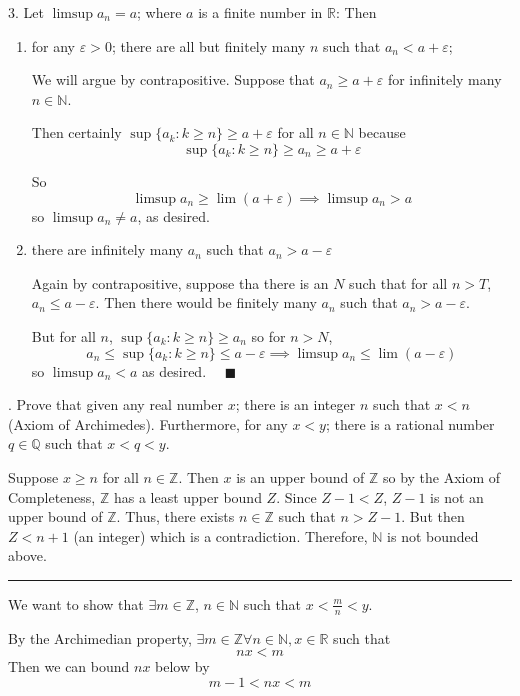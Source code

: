 \documentclass[12pt]{article}
\newcommand{\R}{\mathbb{R}}
\newcommand{\Z}{\mathbb{Z}}
\newcommand{\N}{\mathbb{N}}
\newcommand{\Q}{\mathbb{Q}}
\newcommand{\qed}{\quad \blacksquare}
\newcommand{\ep}{\varepsilon}
\renewcommand{\div}{\vspace*{10pt}\hrule\vspace*{10pt}}
\begin{document}
\pagebreak 

3. Let $\limsup a_n = a$; where $a$ is a finite number in $\R$: Then 
\begin{enumerate}
    \item for any $\ep > 0$; there are all but finitely many $n$ such that $a_n < a + \ep$;
    
    \color{blue}
        We will argue by contrapositive. Suppose that $a_n \geq a + \ep$ for infinitely many $n \in \N$.

        Then certainly $\sup\{a_k: k \geq n\} \geq a +\ep$ for all $n \in \N$ because  
        \[\sup\{a_k: k \geq n\} \geq a_n \geq a + \ep\]

        So 
        \[\limsup a_n \geq \lim (a + \ep) \implies \limsup a_n > a\] 
        so $\limsup a_n \neq a$, as desired. 
        
    \color{black}

    \item there are infinitely many $a_n$ such that $a_n > a - \ep$
    
    \color{blue}
        Again by contrapositive, suppose tha there is an $N$ such that for all $n > T$, $a_n \leq a - \ep$. Then there would be finitely many $a_n$ such that $a_n > a - \ep$.

        But for all $n$, $\sup \{a_k: k \geq n\} \geq a_n$ so for $n > N$, 
        \[a_n \leq \sup \{a_k: k \geq n\} \leq a - \ep \implies \limsup a_n \leq \lim (a- \ep)\]
        so $\limsup a_n < a$ as desired. $\qed$

    \color{black}
\end{enumerate}


. Prove that given any real number $x$; there is an integer $n$ such that $x < n$
(Axiom of Archimedes). Furthermore, for any $x < y$; there is a rational number
$q \in \Q$ such that $x < q < y$.

\color{blue}
    Suppose $x \geq n$ for all $n \in \Z$. Then $x$ is an upper bound of $\Z$ so by the Axiom of Completeness, $\Z$ has a least upper bound $Z$. Since $Z - 1 < Z$, $Z - 1$ is not an upper bound of $\Z$. Thus, there exists $n \in \Z$ such that $n > Z - 1$. But then $Z < n + 1$ (an integer) which is a contradiction. Therefore, $\N$ is not bounded above. 

    \div 

    We want to show that $\exists m \in \Z$, $n \in \N$ such that $x < \frac{m}{n} < y$.

    By the Archimedian property, $\exists m \in \Z \forall n \in \N, x \in \R$ such that 
    \[nx < m\]  
    Then we can bound $nx$ below by  
    \[m - 1 < nx < m\] 
\end{document}
